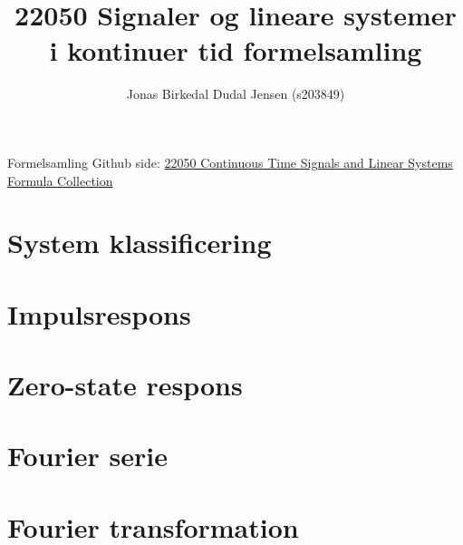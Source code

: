 \documentclass{article}
\title{22050 Signaler og lineare systemer i kontinuer tid formelsamling}
\date{}
\author{Jonas Birkedal Dudal Jensen (s203849)}
\begin{document}
	\maketitle
	\begin{center}
		Formelsamling Github side: \href{https://github.com/jondalnas/22050-Continuous-Time-Signals-and-Linear-Systems-Formula-Collection}{22050 Continuous Time Signals and Linear Systems Formula Collection}
	\end{center}

	\section{System klassificering}
	

	\section{Impulsrespons}
	

	\section{Zero-state respons}
	

	\section{Fourier serie}
	

	\section{Fourier transformation}
	
\end{document}
